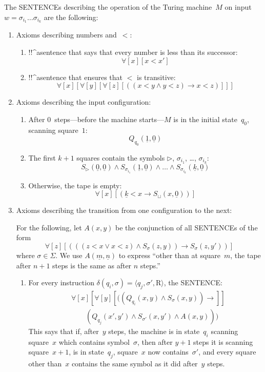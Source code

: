 \documentclass[10pt,a4paper]{article}
\newcommand*{\olup}[1]{\MakeUppercase{#1}}
\theoremstyle{plain}
\theoremstyle{definition}
\theoremstyle{remark}
\newcommand*{\ollabel}[1]{\label{#1}}
\providecommand{\lif}{\mathbin{\rightarrow}}
\providecommand{\lforall}{\mathord{\forall}}
\providecommand{\Obj}{}
\providecommand{\tuple}[1]{\langle #1 \rangle}
\providecommand{\num}[1]{\underline{#1}}
\providecommand{\TMblank}{\sqcup}
\providecommand{\TMright}{\mathrm{R}}
\providecommand{\TMendtape}{\triangleright}
\begin{document}
The \olup{sentence}s describing the operation of the Turing machine~$M$ on
input $w = \sigma_{i_1}\dots\sigma_{i_k}$ are the following:
\begin{enumerate}
\item Axioms describing numbers and~$<$:
\begin{enumerate}
\item !!^a{sentence} that says that every number is less than its successor:
\[
\lforall[x][x < x']
\]
\item !!^a{sentence} that ensures that $<$ is transitive:
\[
\lforall[x][\lforall[y][\lforall[z][
      ((x < y \land y < z) \lif x < z)]]]
\]
\end{enumerate}
\item Axioms describing the input configuration:
\begin{enumerate}
\item After $0$~steps---before the machine starts---$M$ is in
  the initial state~$q_0$, scanning square~$1$:
\[
\Obj Q_{q_0}(\num{1}, \num{0})
\]
\item The first $k+1$ squares contain the symbols $\TMendtape$,
  $\sigma_{i_1}$, \dots, $\sigma_{i_k}$:
\[
\Obj S_\TMendtape(\num{0}, \num{0}) \land
\Obj S_{\sigma_{i_1}}(\num{1}, \num{0}) \land
\dots \land
\Obj S_{\sigma_{i_k}}(\num{k}, \num{0})
\]
\item Otherwise, the tape is empty:
\[
\lforall[x][(\num{k} < x \lif \Obj S_\TMblank(x, \num{0}))]
\]
\end{enumerate}
\item Axioms describing the transition from one configuration to
  the next:

For the following, let $A(x, y)$ be the conjunction of all \olup{sentence}s
of the form
\[
\lforall[z][
  (((z < x \lor x < z) \land \Obj S_\sigma(z, y))
  \lif \Obj S_\sigma(z, y'))]
\]
where $\sigma \in \Sigma$.  We use $A(\num{m},\num{n})$ to express
``other than at square~$m$, the tape after $n+1$ steps is the same as
after $n$ steps.''
\begin{enumerate}
\item \ollabel{rep-right} For every instruction $\delta(q_i, \sigma) =
  \tuple{q_j, \sigma', \TMright}$, the \olup{sentence}:
\begin{align*}
& \lforall[x][\lforall[y][(
   (\Obj Q_{q_i}(x, y) \land \Obj S_{\sigma}(x, y)) \lif {}]] \\
&\qquad   (\Obj Q_{q_j}(x', y') \land \Obj S_{\sigma'}(x, y') \land
A(x, y)))
\end{align*}
This says that if, after~$y$ steps, the machine is in state~$q_i$
scanning square~$x$ which contains symbol~$\sigma$, then after $y+1$
steps it is scanning square~$x+1$, is in state~$q_j$, square~$x$ now
contains~$\sigma'$, and every square other than~$x$ contains the
same symbol as it did after~$y$ steps.


\end{enumerate}
\end{enumerate}
\end{document}
